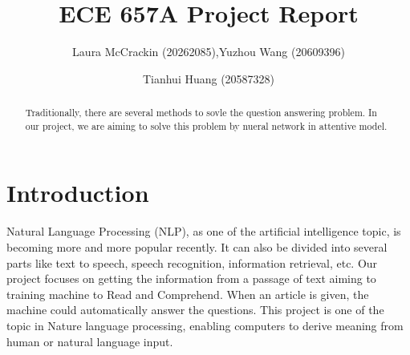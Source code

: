 \documentclass[runningheads,a4paper]{llncs}
\newcommand{\commentontext}[2]{\colorbox{yellow!60}{#1}\pdfcomment[color={0.234 0.867 0.211},hoffset=-6pt,voffset=10pt,opacity=0.5]{#2}}
\newcommand{\commentatside}[1]{\pdfcomment[color={0.045 0.278 0.643},icon=Note]{#1}}
\newcommand{\todo}[1]{\commentatside{#1}}
\begin{document}


\title{ECE 657A Project Report}

\author{Laura McCrackin (20262085),Yuzhou Wang (20609396) \and Tianhui Huang (20587328)}

%
\iffalse

\institute{
University of Waterloo\\
\email{...}\and
University of Waterloo\\
\email{...}
}
\fi
			
\maketitle
\begin{abstract}
Traditionally, there are several methods to sovle the question answering problem. In our project, we are aiming to solve this problem by nueral network in attentive model.
\end{abstract}



\section{Introduction}\label{sec:intro}



Natural Language Processing (NLP), as one of the artificial intelligence topic, is becoming more and more popular recently. It can also be divided into several parts like text to speech, speech recognition, information retrieval, etc. Our project focuses on getting the information from a passage of text aiming to training machine to Read and Comprehend. When an article is given, the machine could automatically answer the questions. This project is one of the topic in Nature language processing, enabling computers to derive meaning from human or natural language input.  
\end{document}
